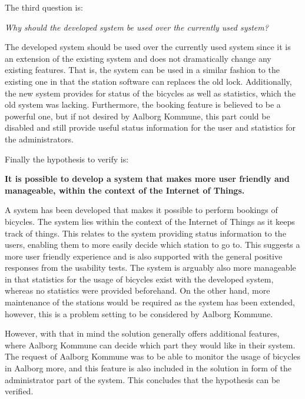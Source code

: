 The third question is:
\begin{center}
	\textit{Why should the developed system be used over the currently used system?}
\end{center}

The developed system should be used over the currently used system since it is an extension of the existing system and does not dramatically change any existing features.
That is, the system can be used in a similar fashion to the existing one in that the station software can replaces the old lock. 
Additionally, the new system provides for status of the bicycles as well as statistics, which the old system was lacking. 
Furthermore, the booking feature is believed to be a powerful one, but if not desired by Aalborg Kommune, this part could be disabled and still provide useful status information for the user and statistics for the administrators.

Finally the hypothesis to verify is:
\begin{center}
	\textbf{It is possible to develop a system that makes \bycykel more user friendly and manageable, within the context of the Internet of Things.}
\end{center}

A system has been developed that makes it possible to perform bookings of bicycles.
The system lies within the context of the Internet of Things as it keeps track of things.
This relates to the system providing status information to the users, enabling them to more easily decide which station to go to.
This suggests a more user friendly experience and is also supported with the general positive responses from the usability tests.
The system is arguably also more manageable in that statistics for the usage of bicycles exist with the developed system, whereas no statistics were provided beforehand.
On the other hand, more maintenance of the stations would be required as the system has been extended, however, this is a problem setting to be considered by Aalborg Kommune.
 
However, with that in mind the solution generally offers additional features, where Aalborg Kommune can decide which part they would like in their system.
The request of Aalborg Kommune was to be able to monitor the usage of bicycles in Aalborg more, and this feature is also included in the solution in form of the administrator part of the system.
This concludes that the hypothesis can be verified.
